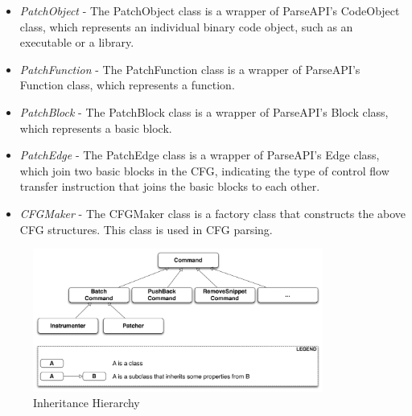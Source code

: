 \begin{itemize}
\item \emph{PatchObject} - The PatchObject class is a wrapper of ParseAPI's CodeObject
    class, which represents an individual binary code object, such as an
    executable or a library.
\item \emph{PatchFunction} - The PatchFunction class is a wrapper of ParseAPI's
    Function class, which represents a function.
\item \emph{PatchBlock} - The PatchBlock class is a wrapper of ParseAPI's Block class,
    which represents a basic block.
\item \emph{PatchEdge} - The PatchEdge class is a wrapper of ParseAPI's Edge class,
    which join two basic blocks in the CFG, indicating the type of control flow
    transfer instruction that joins the basic blocks to each other.
\item \emph{CFGMaker} - The CFGMaker class is a factory class that constructs the above
    CFG structures. This class is used in CFG parsing.

\end{itemize}
\begin{figure}[ht!]
\centerline{\includegraphics[width=0.85\textwidth]{./figure/command/img.pdf}}
\caption{\label{fig:inh}Inheritance Hierarchy}
\end{figure}


